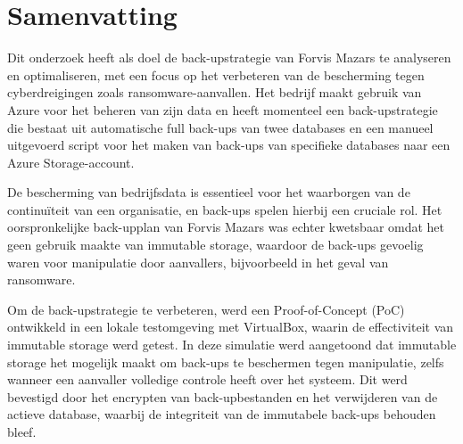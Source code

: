 
%
%
%
%
%

%




\chapter*{Samenvatting}
Dit onderzoek heeft als doel de back-upstrategie van Forvis Mazars te analyseren en optimaliseren, met een focus op het verbeteren van de bescherming tegen cyberdreigingen zoals ransomware-aanvallen. Het bedrijf maakt gebruik van Azure voor het beheren van zijn data en heeft momenteel een back-upstrategie die bestaat uit automatische full back-ups van twee databases en een manueel uitgevoerd script voor het maken van back-ups van specifieke databases naar een Azure Storage-account.

De bescherming van bedrijfsdata is essentieel voor het waarborgen van de continuïteit van een organisatie, en back-ups spelen hierbij een cruciale rol. Het oorspronkelijke back-upplan van Forvis Mazars was echter kwetsbaar omdat het geen gebruik maakte van immutable storage, waardoor de back-ups gevoelig waren voor manipulatie door aanvallers, bijvoorbeeld in het geval van ransomware.

Om de back-upstrategie te verbeteren, werd een Proof-of-Concept (PoC) ontwikkeld in een lokale testomgeving met VirtualBox, waarin de effectiviteit van immutable storage werd getest. In deze simulatie werd aangetoond dat immutable storage het mogelijk maakt om back-ups te beschermen tegen manipulatie, zelfs wanneer een aanvaller volledige controle heeft over het systeem. Dit werd bevestigd door het encrypten van back-upbestanden en het verwijderen van de actieve database, waarbij de integriteit van de immutabele back-ups behouden bleef.

